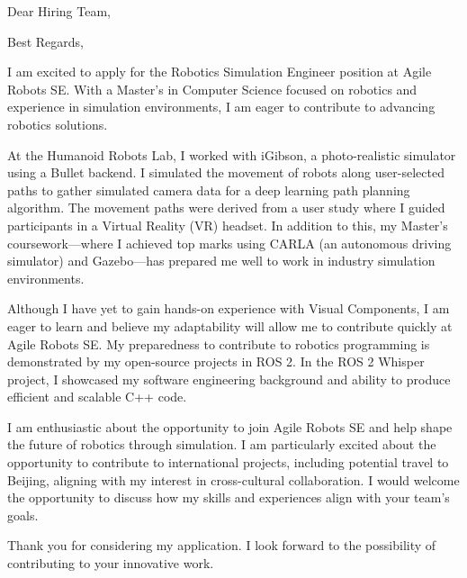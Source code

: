 \documentclass[11pt,a4paper,skipsamekey]{moderncv}
\begin{document}
	\date{\today}
	\opening{Dear Hiring Team,}
	\closing{Best Regards,}
	\makelettertitle
	
	I am excited to apply for the Robotics Simulation Engineer position at Agile Robots SE.
	With a Master’s in Computer Science focused on robotics and experience in simulation environments, I am eager to contribute to advancing robotics solutions.
	
	At the Humanoid Robots Lab, I worked with iGibson, a photo-realistic simulator using a Bullet backend.
	I simulated the movement of robots along user-selected paths to gather simulated camera data for a deep learning path planning algorithm.
	The movement paths were derived from a user study where I guided participants in a Virtual Reality (VR) headset.
	In addition to this, my Master’s coursework—where I achieved top marks using CARLA (an autonomous driving simulator) and Gazebo—has prepared me well to work in industry simulation environments.
	
	Although I have yet to gain hands-on experience with Visual Components, I am eager to learn and believe my adaptability will allow me to contribute quickly at Agile Robots SE.
	My preparedness to contribute to robotics programming is demonstrated by my open-source projects in ROS 2.
	In the ROS 2 Whisper project, I showcased my software engineering background and ability to produce efficient and scalable C++ code.
	
	I am enthusiastic about the opportunity to join Agile Robots SE and help shape the future of robotics through simulation.
	I am particularly excited about the opportunity to contribute to international projects, including potential travel to Beijing, aligning with my interest in cross-cultural collaboration.
	I would welcome the opportunity to discuss how my skills and experiences align with your team’s goals.
	
	Thank you for considering my application. I look forward to the possibility of contributing to your innovative work.
	
\end{document}
